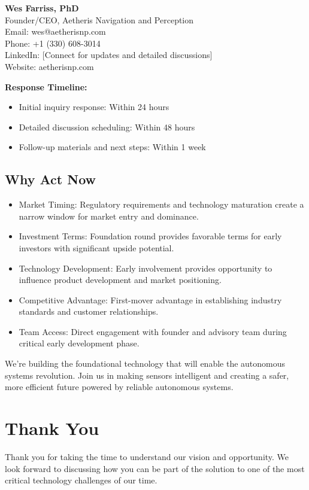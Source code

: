 \documentclass[11pt,letterpaper]{article}
\begin{document}
\textbf{Wes Farriss, PhD}\\
Founder/CEO, Aetheris Navigation and Perception\\
Email: wes@aetherisnp.com\\
Phone: +1 (330) 608-3014\\
LinkedIn: [Connect for updates and detailed discussions]\\
Website: aetherisnp.com

\textbf{Response Timeline:}
\begin{itemize}[leftmargin=10pt, itemsep=1pt]
    \item Initial inquiry response: Within 24 hours
    \item Detailed discussion scheduling: Within 48 hours
    \item Follow-up materials and next steps: Within 1 week
\end{itemize}

\subsection*{Why Act Now}

\begin{itemize}[leftmargin=10pt, itemsep=1pt]
    \item Market Timing: Regulatory requirements and technology maturation create a narrow window for market entry and dominance.
    \item Investment Terms: Foundation round provides favorable terms for early investors with significant upside potential.
    \item Technology Development: Early involvement provides opportunity to influence product development and market positioning.
    \item Competitive Advantage: First-mover advantage in establishing industry standards and customer relationships.
    \item Team Access: Direct engagement with founder and advisory team during critical early development phase.
\end{itemize}

We're building the foundational technology that will enable the autonomous systems revolution. Join us in making sensors intelligent and creating a safer, more efficient future powered by reliable autonomous systems.

\section*{Thank You}

Thank you for taking the time to understand our vision and opportunity. We look forward to discussing how you can be part of the solution to one of the most critical technology challenges of our time.
\end{document}
